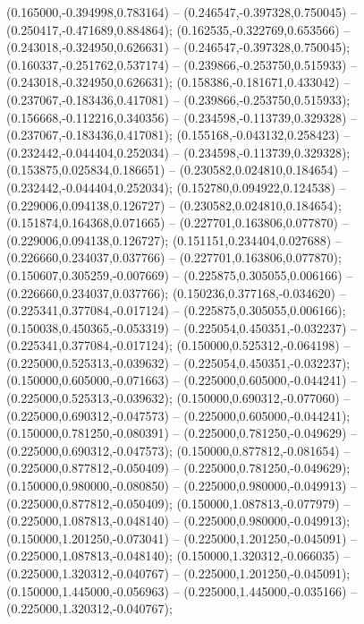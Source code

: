  (0.165000,-0.394998,0.783164) -- (0.246547,-0.397328,0.750045) -- (0.250417,-0.471689,0.884864);
 (0.162535,-0.322769,0.653566) -- (0.243018,-0.324950,0.626631) -- (0.246547,-0.397328,0.750045);
 (0.160337,-0.251762,0.537174) -- (0.239866,-0.253750,0.515933) -- (0.243018,-0.324950,0.626631);
 (0.158386,-0.181671,0.433042) -- (0.237067,-0.183436,0.417081) -- (0.239866,-0.253750,0.515933);
 (0.156668,-0.112216,0.340356) -- (0.234598,-0.113739,0.329328) -- (0.237067,-0.183436,0.417081);
 (0.155168,-0.043132,0.258423) -- (0.232442,-0.044404,0.252034) -- (0.234598,-0.113739,0.329328);
 (0.153875,0.025834,0.186651) -- (0.230582,0.024810,0.184654) -- (0.232442,-0.044404,0.252034);
 (0.152780,0.094922,0.124538) -- (0.229006,0.094138,0.126727) -- (0.230582,0.024810,0.184654);
 (0.151874,0.164368,0.071665) -- (0.227701,0.163806,0.077870) -- (0.229006,0.094138,0.126727);
 (0.151151,0.234404,0.027688) -- (0.226660,0.234037,0.037766) -- (0.227701,0.163806,0.077870);
 (0.150607,0.305259,-0.007669) -- (0.225875,0.305055,0.006166) -- (0.226660,0.234037,0.037766);
 (0.150236,0.377168,-0.034620) -- (0.225341,0.377084,-0.017124) -- (0.225875,0.305055,0.006166);
 (0.150038,0.450365,-0.053319) -- (0.225054,0.450351,-0.032237) -- (0.225341,0.377084,-0.017124);
 (0.150000,0.525312,-0.064198) -- (0.225000,0.525313,-0.039632) -- (0.225054,0.450351,-0.032237);
 (0.150000,0.605000,-0.071663) -- (0.225000,0.605000,-0.044241) -- (0.225000,0.525313,-0.039632);
 (0.150000,0.690312,-0.077060) -- (0.225000,0.690312,-0.047573) -- (0.225000,0.605000,-0.044241);
 (0.150000,0.781250,-0.080391) -- (0.225000,0.781250,-0.049629) -- (0.225000,0.690312,-0.047573);
 (0.150000,0.877812,-0.081654) -- (0.225000,0.877812,-0.050409) -- (0.225000,0.781250,-0.049629);
 (0.150000,0.980000,-0.080850) -- (0.225000,0.980000,-0.049913) -- (0.225000,0.877812,-0.050409);
 (0.150000,1.087813,-0.077979) -- (0.225000,1.087813,-0.048140) -- (0.225000,0.980000,-0.049913);
 (0.150000,1.201250,-0.073041) -- (0.225000,1.201250,-0.045091) -- (0.225000,1.087813,-0.048140);
 (0.150000,1.320312,-0.066035) -- (0.225000,1.320312,-0.040767) -- (0.225000,1.201250,-0.045091);
 (0.150000,1.445000,-0.056963) -- (0.225000,1.445000,-0.035166) -- (0.225000,1.320312,-0.040767);
